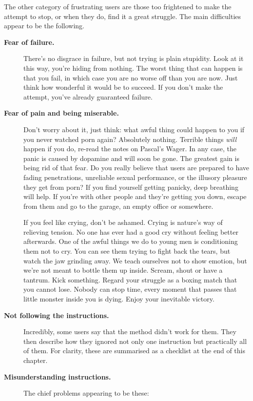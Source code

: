 \documentclass[
]{book}
\begin{document}
The other category of frustrating users are those too frightened to make the attempt to stop, or when they do, find it a great struggle. The main difficulties appear to be the following.

\begin{description}
\item[\textbf{Fear of failure.}]
There's no disgrace in failure, but not trying is plain stupidity. Look at it this way, you're hiding from nothing. The worst thing that can happen is that you fail, in which case you are no worse off than you are now. Just think how wonderful it would be to succeed. If you don't make the attempt, you've already guaranteed failure.
\item[\textbf{Fear of pain and being miserable.}]
Don't worry about it, just think: what awful thing could happen to you if you never watched porn again? Absolutely nothing. Terrible things \emph{will} happen if you do, re-read the notes on Pascal's Wager. In any case, the panic is caused by dopamine and will soon be gone. The greatest gain is being rid of that fear. Do you really believe that users are prepared to have fading penetrations, unreliable sexual performance, or the illusory pleasure they get from porn? If you find yourself getting panicky, deep breathing will help. If you're with other people and they're getting you down, escape from them and go to the garage, an empty office or somewhere.

If you feel like crying, don't be ashamed. Crying is nature's way of relieving tension. No one has ever had a good cry without feeling better afterwards. One of the awful things we do to young men is conditioning them not to cry. You can see them trying to fight back the tears, but watch the jaw grinding away. We teach ourselves not to show emotion, but we're not meant to bottle them up inside. Scream, shout or have a tantrum. Kick something. Regard your struggle as a boxing match that you cannot lose. Nobody can stop time, every moment that passes that little monster inside you is dying. Enjoy your inevitable victory.
\item[\textbf{Not following the instructions.}]
Incredibly, some users say that the method didn't work for them. They then describe how they ignored not only one instruction but practically all of them. For clarity, these are summarised as a checklist at the end of this chapter.
\item[\textbf{Misunderstanding instructions.}]
The chief problems appearing to be these:


\end{description}
\end{document}

